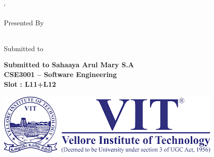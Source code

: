 \pagestyle{empty}

\begin{titlepage}
        \begin{center}
        \vspace*{1.0cm}
    `   
        \Huge 
        {\bf \thesistitlecoverpage }

        \vspace*{1.0cm}
        \normalsize
        Presented By
        

        \vspace*{1.0cm}

        \Large
        \thesisauthor \\
        \vspace*{1.0cm}
        \normalsize
        Submitted to 

        \vspace*{1.0cm}

        \normalsize
       {\bf Submitted to Sahaaya Arul Mary S.A\\ \faculty 
       CSE3001 – Software Engineering \\Slot : L11+L12 \\}
        \vspace*{2.0cm}
        

        

        \vspace*{1.0cm}
        \includegraphics[scale=0.7]{images.png}

        
        \end{center}
\end{titlepage}

\pagestyle{plain}
\setcounter{page}{2}

\cleardoublepage %
